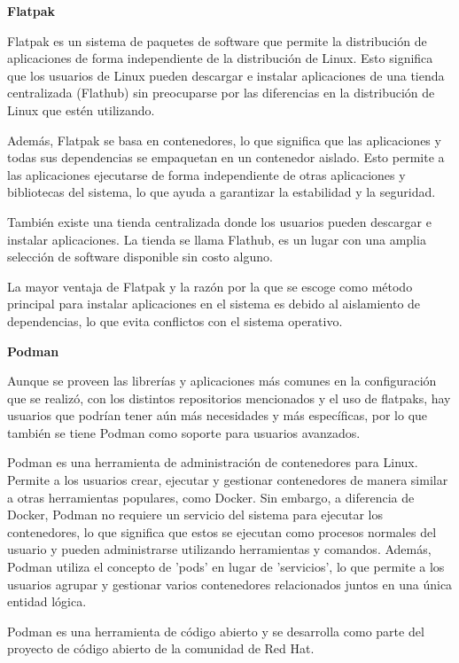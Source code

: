 \begin{spacing}{1.5}
    \textbf{Flatpak}
    
    Flatpak es un sistema de paquetes de software que permite la distribución de aplicaciones de forma independiente de la distribución de Linux. Esto significa que los usuarios de Linux pueden descargar e instalar aplicaciones de una tienda centralizada (Flathub) sin preocuparse por las diferencias en la distribución de Linux que estén utilizando.

    Además, Flatpak se basa en contenedores, lo que significa que las aplicaciones y todas sus dependencias se empaquetan en un contenedor aislado. Esto permite a las aplicaciones ejecutarse de forma independiente de otras aplicaciones y bibliotecas del sistema, lo que ayuda a garantizar la estabilidad y la seguridad.

    También existe una tienda centralizada donde los usuarios pueden descargar e instalar aplicaciones. La tienda se llama Flathub, es un lugar con una amplia selección de software disponible sin costo alguno.

    La mayor ventaja de Flatpak y la razón por la que se escoge como método principal para instalar aplicaciones en el sistema es debido al aislamiento de dependencias, lo que evita conflictos con el sistema operativo. \cite{FLAT-1} \cite{FLAT-2} \cite{RHEL-FLAT-1} \cite{PHOENIX-FLAT-1}

    \textbf{Podman}
    
    Aunque se proveen las librerías y aplicaciones más comunes en la configuración que se realizó, con los distintos repositorios mencionados y el uso de flatpaks, hay usuarios que podrían tener aún más necesidades y más específicas, por lo que también se tiene Podman como soporte para usuarios avanzados.

    Podman es una herramienta de administración de contenedores para Linux. Permite a los usuarios crear, ejecutar y gestionar contenedores de manera similar a otras herramientas populares, como Docker. Sin embargo, a diferencia de Docker, Podman no requiere un servicio del sistema para ejecutar los contenedores, lo que significa que estos se ejecutan como procesos normales del usuario y pueden administrarse utilizando herramientas y comandos. Además, Podman utiliza el concepto de 'pods' en lugar de 'servicios', lo que permite a los usuarios agrupar y gestionar varios contenedores relacionados juntos en una única entidad lógica. 
    
    Podman es una herramienta de código abierto y se desarrolla como parte del proyecto de código abierto de la comunidad de Red Hat. \cite{RHEL-podman-1}


\end{spacing}

